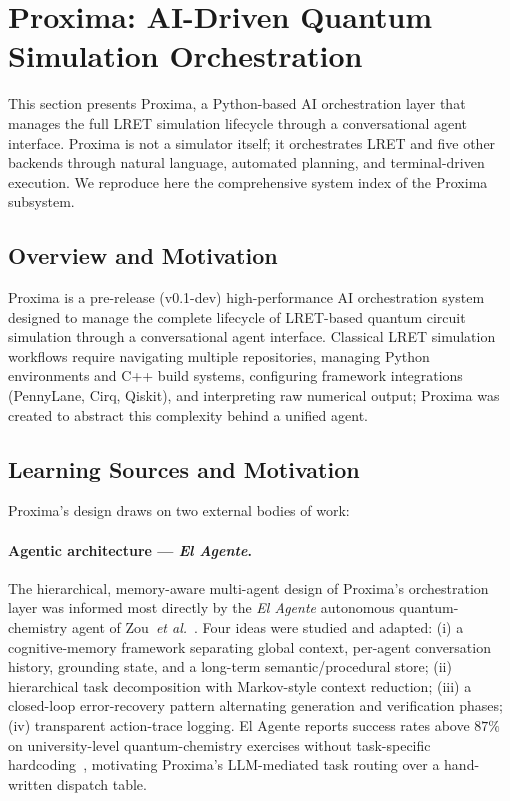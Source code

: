 \documentclass[11pt,a4paper]{article}
\begin{document}
\section{Proxima: AI-Driven Quantum Simulation Orchestration}
\label{sec:proxima}

This section presents Proxima, a Python-based AI orchestration layer that manages the
full LRET simulation lifecycle through a conversational agent interface. Proxima is
not a simulator itself; it orchestrates LRET and five other backends through natural
language, automated planning, and terminal-driven execution. We reproduce here the
comprehensive system index of the Proxima subsystem.

\subsection{Overview and Motivation}

Proxima is a pre-release (v0.1-dev) high-performance AI orchestration system
designed to manage the complete lifecycle of LRET-based quantum circuit simulation
through a conversational agent interface. Classical LRET simulation workflows require
navigating multiple repositories, managing Python environments and C++ build systems,
configuring framework integrations (PennyLane, Cirq, Qiskit), and interpreting raw
numerical output; Proxima was created to abstract this complexity behind a unified
agent.

\subsection{Learning Sources and Motivation}
\label{sec:proxima-learning}

Proxima's design draws on two external bodies of work:

\paragraph{Agentic architecture --- \emph{El Agente}.}
The hierarchical, memory-aware multi-agent design of Proxima's orchestration layer
was informed most directly by the \emph{El Agente} autonomous quantum-chemistry agent
of Zou~\textit{et al.}~\cite{zou2025elagente}. Four ideas were studied and adapted:
(i) a cognitive-memory framework separating global context, per-agent conversation
history, grounding state, and a long-term semantic/procedural store; (ii) hierarchical
task decomposition with Markov-style context reduction; (iii) a closed-loop
error-recovery pattern alternating generation and verification phases; (iv)
transparent action-trace logging. El Agente reports success rates above $87\%$ on
university-level quantum-chemistry exercises without task-specific
hardcoding~\cite{zou2025elagente}, motivating Proxima's LLM-mediated task routing
over a hand-written dispatch table.
\end{document}

